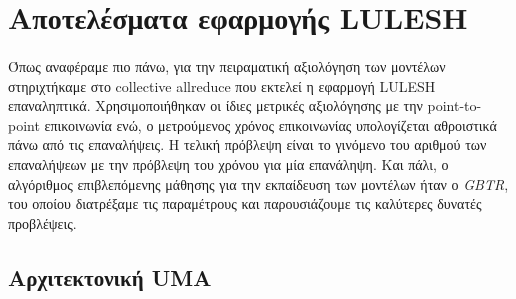 \section{Αποτελέσματα εφαρμογής LULESH}
\paragraph{}
Όπως αναφέραμε πιο πάνω, για την πειραματική αξιολόγηση των μοντέλων στηριχτήκαμε στο collective allreduce που εκτελεί η εφαρμογή LULESH επαναληπτικά.  Χρησιμοποιήθηκαν οι ίδιες μετρικές αξιολόγησης με την point-to-point επικοινωνία ενώ, ο μετρούμενος χρόνος επικοινωνίας υπολογίζεται αθροιστικά πάνω από τις επαναλήψεις. H τελική πρόβλεψη είναι το γινόμενο του αριθμού των επαναλήψεων με την πρόβλεψη του χρόνου για μία επανάληψη. Και πάλι, ο αλγόριθμος επιβλεπόμενης μάθησης για την εκπαίδευση των μοντέλων ήταν ο \textit{GBTR}, του οποίου  διατρέξαμε τις παραμέτρους και παρουσιάζουμε τις καλύτερες δυνατές προβλέψεις. 
\subsection{Αρχιτεκτονική UMA}
